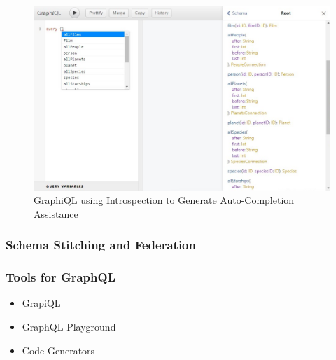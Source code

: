 \begin{figure}[htb!]
    \includegraphics[width=\textwidth]{images/graphiql-autocomplete.png}
    \caption{GraphiQL using Introspection to Generate Auto-Completion Assistance}\label{img:graphiql-introspection}
\end{figure}

\subsubsection{Schema Stitching and Federation}

\subsubsection{Tools for GraphQL}

\begin{itemize}
    \item GrapiQL
    \item GraphQL Playground
    \item Code Generators
\end{itemize}